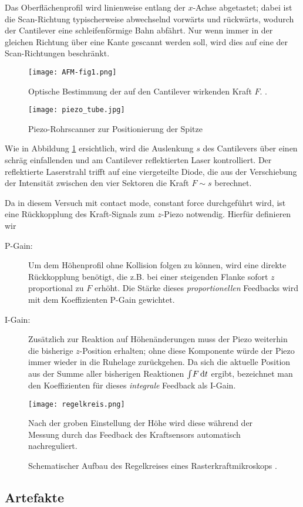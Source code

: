 Das Oberflächenprofil wird linienweise entlang der $x$-Achse abgetastet; dabei ist die Scan-Richtung typischerweise abwechselnd vorwärts und rückwärts, wodurch der Cantilever eine schleifenförmige Bahn abfährt. Nur wenn immer in der gleichen Richtung über eine Kante gescannt werden soll, wird dies auf eine der Scan-Richtungen beschränkt.


\begin{figure}[p]
	\centering
	\texttt{[image: AFM-fig1.png]}
	\caption{Optische Bestimmung der auf den Cantilever wirkenden Kraft $F$. \cite{lit:grenoble}.}
	\label{fig:laser}
\end{figure}

\begin{figure}[p]
	\centering
	\texttt{[image: piezo\_tube.jpg]}
	\caption{Piezo-Rohrscanner zur Positionierung der Spitze \cite{lit:tube}}
	\label{fig:tube}
\end{figure}

Wie in Abbildung \ref{fig:laser} ersichtlich, wird die Auslenkung $s$ des Cantilevers über einen schräg einfallenden und am Cantilever reflektierten Laser kontrolliert. Der reflektierte Laserstrahl trifft auf eine viergeteilte Diode, die aus der Verschiebung der Intensität zwischen den vier Sektoren die Kraft $F \sim s$ berechnet.

Da in diesem Versuch mit contact mode, constant force durchgeführt wird, ist eine Rückkopplung des Kraft-Signals zum $z$-Piezo notwendig. Hierfür definieren wir
\begin{description}
\item[P-Gain:] Um dem Höhenprofil ohne Kollision folgen zu können, wird eine direkte Rückkopplung benötigt, die z.B. bei einer steigenden Flanke sofort $z$ proportional zu $F$ erhöht. Die Stärke dieses \emph{proportionellen} Feedbacks wird mit dem Koeffizienten P-Gain gewichtet.
\item[I-Gain:] Zusätzlich zur Reaktion auf Höhenänderungen muss der Piezo weiterhin die bisherige $z$-Position erhalten; ohne diese Komponente würde der Piezo immer wieder in die Ruhelage zurückgehen. Da sich die aktuelle Position aus der Summe aller bisherigen Reaktionen $\int\! F \,\mathrm{d} t$ ergibt, bezeichnet man den Koeffizienten für dieses \emph{integrale} Feedback als I-Gain.
\end{description}

\begin{figure}[p]
	\centering
	\texttt{[image: regelkreis.png]}
	\caption{Schematischer Aufbau des Regelkreises eines Rasterkraftmikroskops \cite{lit:guide}.}
			Nach der groben Einstellung der Höhe wird diese während der Messung durch das Feedback des Kraftsensors automatisch nachreguliert.
	\label{fig:feedback}
\end{figure}

\subsection{Artefakte}
